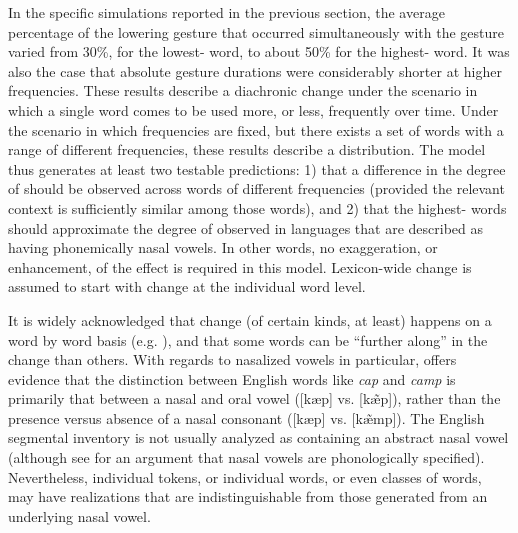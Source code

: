 In the specific simulations reported in the previous section, the
average percentage of the  lowering gesture that occurred simultaneously
with the  gesture varied from 30\%, for the lowest-
word, to about 50\% for the highest- word. It was also the
case that absolute gesture durations were considerably shorter
at higher frequencies. These results describe a diachronic change
under the scenario in which a single word comes to be used more, or
less, frequently over time. Under the scenario in which frequencies
are fixed, but there exists a set of words with a range of different
frequencies, these results describe a  distribution. The
model thus generates at least two testable predictions: 1) that a
difference in the degree of  should be observed
across words of different frequencies (provided the relevant 
context is sufficiently similar among those words), and 2) that the
highest- words should approximate the degree of 
observed in languages that are described as having phonemically nasal
vowels. In other words, no exaggeration, or enhancement, of the effect
is required in this model. Lexicon-wide change is assumed to start
with change at the individual word level.

It is widely acknowledged that change (of certain kinds, at least)
happens on a word by word basis (e.g. \citealt{Phillips1984,Bybee2002,Pierrehumbert2002}),
and that some words can be ``further along'' in the change than others.
With regards to nasalized vowels in particular, \citet{malecot1960vowel}
offers evidence that the distinction between English words like \textit{cap}
and \textit{camp} is primarily that between a nasal and oral vowel
({[kæp]} vs. {[kæ̃p]}), rather than the presence
versus absence of a nasal consonant ({[kæp]} vs. {[kæ̃mp]}).
The English segmental inventory is not usually analyzed as containing
an abstract nasal vowel (although see \citealt{Sole1992} for an argument
that nasal vowels are phonologically specified). Nevertheless, individual
tokens, or individual words, or even classes of words, may have 
realizations that are indistinguishable from those generated from
an underlying nasal vowel. 
